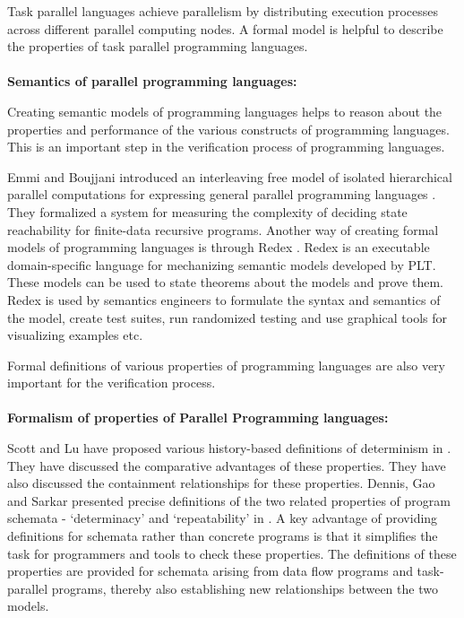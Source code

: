 Task parallel languages achieve parallelism by distributing execution processes across different parallel computing nodes. A formal model is helpful to describe the properties of task parallel programming languages. 
\\
\\
\textbf{Semantics of parallel programming languages:} 

Creating semantic models of programming languages helps to reason about the properties and performance of the various constructs of programming languages. This is an important step in the verification process of programming languages.

Emmi and Boujjani introduced an interleaving free model of isolated hierarchical parallel computations for expressing general parallel programming languages \cite{bouajjani2012analysis}. They formalized a system for measuring the complexity of deciding state reachability for finite-data recursive programs. Another way of creating formal models of programming languages is through Redex \cite{klein2012run}. Redex is an executable domain-specific language for mechanizing semantic models developed by PLT. These models can be used to state theorems about the models and prove them. Redex is used by semantics engineers to formulate the syntax and semantics of the model, create test suites, run randomized testing and use graphical tools for visualizing examples etc.

Formal definitions of various properties of programming languages are also very important for the verification process.
\\
\\
\textbf{Formalism of properties of Parallel Programming languages:}

Scott and Lu have proposed various history-based definitions of determinism in \cite{lu2011toward}. They have discussed the comparative advantages of these properties. They have also discussed the containment relationships for these properties. Dennis, Gao and Sarkar presented precise definitions of the two related properties of program schemata - ‘determinacy’ and ‘repeatability’ in \cite{dennis2012determinacy}. A key advantage of providing definitions for schemata rather than concrete programs is that it simplifies the task for programmers and tools to check these properties. The definitions of these properties are provided for schemata arising from data flow programs and task-parallel programs, thereby also establishing new relationships between the two models.

